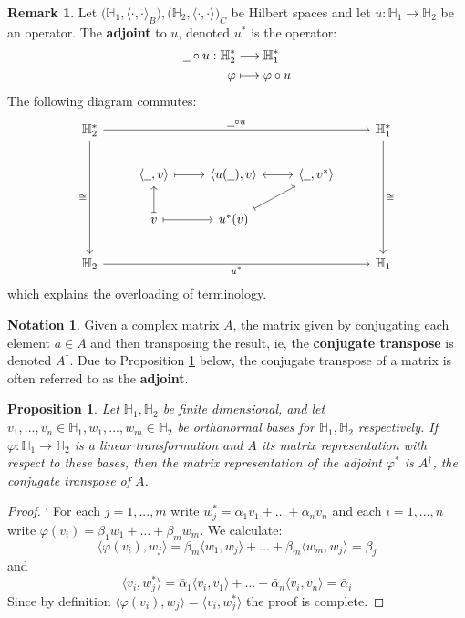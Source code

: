\documentclass[12pt]{article}
\theoremstyle{plain}
\newtheorem{proposition}[thm]{Proposition}
\theoremstyle{definition}
\newtheorem{notation}[thm]{Notation}
\newtheorem{remark}[thm]{Remark}
\newcommand{\bb}[1]{\mathbb{#1}}
\newcommand{\und}[1]{\underline{\hspace{#1 cm}}}
\newcommand{\lto}{\longrightarrow}
\begin{document}
\begin{remark}
	Let $\big(\bb{H}_1,\langle\cdot,\cdot\rangle_B\big), \big(\bb{H}_2,\langle \cdot, \cdot \rangle\big)_C$ be Hilbert spaces and let $u: \bb{H}_1 \lto \bb{H}_2$ be an operator. The \textbf{adjoint} to $u$, denoted $u^\ast$ is the operator:
	\begin{align}
		\und{0.2} \circ u: \bb{H}_2^\ast &\lto \bb{H}_1^\ast\\
		\varphi &\longmapsto \varphi \circ u
	\end{align}
	The following diagram commutes:
	\begin{equation}
		\begin{tikzcd}
			\bb{H}_{2}^{\ast}\arrow[rrrr,"{\und{0.2} \circ u}"]\arrow[ddd,swap,"{\cong}"] & & & & \bb{H}_1^{\ast}\arrow[ddd,"{\cong}"]\\
			&\langle\und{0.2},v\rangle\arrow[r,mapsto] & \langle u(\und{0.2}), v\rangle\arrow[r,leftrightarrow] & \langle \und{0.2},v^{\ast}\rangle\\
			&v\arrow[r,mapsto]\arrow[u,mapsto] & u^{\ast}(v)\arrow[ur,mapsto]\\
			\bb{H}_2\arrow[rrrr,swap,"{u^\ast}"] & & & & \bb{H}_1
		\end{tikzcd}
	\end{equation}
	which explains the overloading of terminology.
\end{remark}
\begin{notation}
	Given a complex matrix $A$, the matrix given by conjugating each element $a \in A$ and then transposing the result, ie, the \textbf{conjugate transpose} is denoted $A^{\dagger}$. Due to Proposition \ref{prop:transpose_matrix} below, the conjugate transpose of a matrix is often referred to as the \textbf{adjoint}.
\end{notation}
\begin{proposition}\label{prop:transpose_matrix}
	Let $\bb{H}_1,\bb{H}_2$ be finite dimensional, and let $v_1,...,v_n \in \bb{H}_1, w_1,...,w_m\in \bb{H}_2$ be orthonormal bases for $\bb{H}_1,\bb{H}_2$ respectively. If $\varphi: \bb{H}_1 \lto \bb{H}_2$ is a linear transformation and $A$ its matrix representation with respect to these bases, then the matrix representation of the adjoint $\varphi^\ast$ is $A^\dagger$, the conjugate transpose of $A$.
\end{proposition}
\begin{proof}`
	For each $j = 1,...,m$ write $w_j^\ast = \alpha_1 v_1 + \hdots + \alpha_n v_n$ and each $i = 1,...,n$ write $\varphi(v_i) = \beta_1 w_1 + \hdots + \beta_m w_m$. We calculate:
	\begin{equation}
		\langle \varphi(v_i), w_j\rangle = \beta_m \langle w_1, w_j \rangle + \hdots + \beta_m \langle w_m, w_j\rangle = \beta_j
	\end{equation}
	and
	\begin{equation}
		\langle v_i, w_j^\ast\rangle = \bar{\alpha}_1 \langle v_i, v_1\rangle + \hdots + \bar{\alpha}_n \langle v_i, v_n \rangle = \bar{\alpha}_i
	\end{equation}
	Since by definition $\langle \varphi(v_i), w_j\rangle = \langle v_i, w_j^\ast\rangle$ the proof is complete.
\end{proof}
\end{document}
